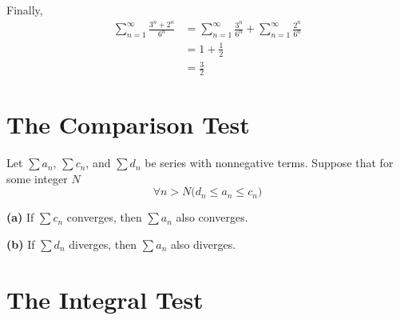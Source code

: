 \begin{ex}
\begin{sol}
\begin{figure}[H]
\begin{center}
{        }
      \end{center}
    \end{figure}

    Finally,
    \begin{align*}
      \sum_{n=1}^{\infty} \frac{3^n+2^n}{6^n}&=\sum_{n=1}^\infty
      \frac{3^n}{6^n} + \sum_{n=1}^\infty
      \frac{2^n}{6^n} \\
      &=1+\frac{1}{2} \\
      &= \frac{3}{2}
    \end{align*}
    \end{sol}
\end{ex}

\section{The Comparison Test}

\begin{theorem}\label{th:seriescomp}
  Let $\sum a_n$, $\sum c_n$, and $\sum d_n$ be series with nonnegative terms.
  Suppose that for some integer $N$
  \[ \forall n > N \bigg(d_n \leq a_n \leq c_n\bigg) \]

  \textbf{(a)} If $\sum c_n$ converges, then $\sum a_n$ also converges.

  \textbf{(b)} If $\sum d_n$ diverges, then $\sum a_n$ also diverges.
\end{theorem}

\section{The Integral Test}

